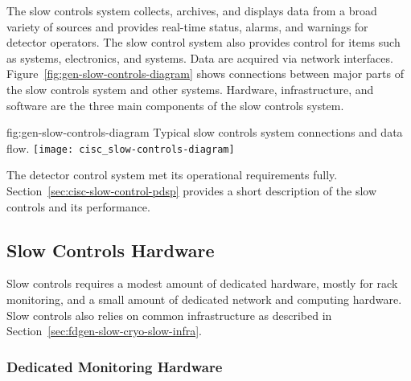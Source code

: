The slow controls system collects, archives, and displays data from
a broad variety of sources and provides real-time status, alarms, and warnings for detector operators. The slow control system also provides control for %
items such as  systems,  electronics, and  systems. Data are acquired via network interfaces.  Figure~\ref{fig:gen-slow-controls-diagram} shows connections between major parts of the slow controls system and other systems. Hardware, infrastructure, and software are the three main components of the slow controls system. %

\begin{dunefigure}{fig:gen-slow-controls-diagram}
{Typical slow controls system connections and data flow.}
\texttt{[image: cisc\_slow-controls-diagram]}
\end{dunefigure}

The  detector control system\cite{pdspdcs_proc}  met its operational requirements fully. %
Section~\ref{sec:cisc-slow-control-pdsp} provides a short description of the  slow controls and its performance.

 \subsection{Slow Controls Hardware}
\label{sec:fdgen-slow-cryo-hdwr}

Slow controls requires a modest amount of dedicated hardware, mostly for rack monitoring,  %
and a small amount of dedicated network and
computing hardware. %
Slow controls also relies on common
infrastructure as described in
Section~\ref{sec:fdgen-slow-cryo-slow-infra}.

\subsubsection{Dedicated Monitoring Hardware}

